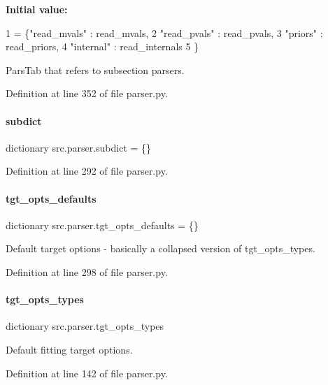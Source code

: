 {\bfseries Initial value\+:}
\begin{DoxyCode}
1 =  \{\textcolor{stringliteral}{"read\_mvals"} : read\_mvals,
2             \textcolor{stringliteral}{"read\_pvals"} : read\_pvals,
3             \textcolor{stringliteral}{"priors"}     : read\_priors,
4             \textcolor{stringliteral}{"internal"}   : read\_internals
5             \}
\end{DoxyCode}


Pars\+Tab that refers to subsection parsers. 



Definition at line 352 of file parser.\+py.

\mbox{\label{namespacesrc_1_1parser_acb02e552cbc9ba8a6aa198cfb3f611d1}} 
\paragraph{\texorpdfstring{subdict}{subdict}}
{\footnotesize\ttfamily dictionary src.\+parser.\+subdict = \{\}}



Definition at line 292 of file parser.\+py.

\mbox{\label{namespacesrc_1_1parser_ae5983fa8e346d61dd63f2ecb04d1b2ab}} 
\paragraph{\texorpdfstring{tgt\+\_\+opts\+\_\+defaults}{tgt\_opts\_defaults}}
{\footnotesize\ttfamily dictionary src.\+parser.\+tgt\+\_\+opts\+\_\+defaults = \{\}}



Default target options -\/ basically a collapsed version of tgt\+\_\+opts\+\_\+types. 



Definition at line 298 of file parser.\+py.

\mbox{\label{namespacesrc_1_1parser_a2bdfa0e60da43a8d38b4a460cde96c27}} 
\paragraph{\texorpdfstring{tgt\+\_\+opts\+\_\+types}{tgt\_opts\_types}}
{\footnotesize\ttfamily dictionary src.\+parser.\+tgt\+\_\+opts\+\_\+types}



Default fitting target options. 



Definition at line 142 of file parser.\+py.

